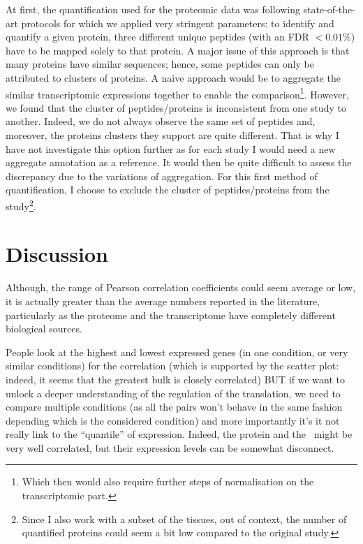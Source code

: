 At first, the quantification used for the proteomic data was following
state-of-the-art protocols for which we applied very stringent parameters:
to identify and quantify a given protein, three different unique peptides
(with an \gls{FDR} $< 0.01 \%$) have to be mapped solely to that protein.
A major issue of this approach is that many proteins have similar sequences;
hence, some peptides can only be attributed to clusters of proteins.
A naive approach would
be to aggregate the similar transcriptomic expressions together to enable
the comparison\footnote{Which then would also require further steps of
normalisation on the transcriptomic part.}. However, we found that the cluster
of peptides/proteins is inconsistent from one study to another. Indeed, we do
not always observe the same set of peptides and, moreover, the proteins clusters
they support are quite different. That is why I have not investigate this option
further as for each study I would need a new aggregate annotation as a reference.
It would then be quite difficult to assess the discrepancy due to the
variations of aggregation. For this first method of quantification, I choose to
exclude the cluster of peptides/proteins from the study\footnote{Since I also work
with a subset of the tissues, out of context, the number of quantified proteins
could seem a bit low compared to the original study.}.

\section{Discussion}

Although, the range of Pearson correlation coefficients could seem average or
low, it is actually greater than the average numbers reported in the literature,
particularly as the proteome and the transcriptome have completely different
biological sources.


People look at the highest and lowest expressed genes (in one condition, or very
similar conditions) for the correlation (which is supported by the scatter plot:
indeed, it seems that the greatest bulk is closely correlated) {\Large BUT} if we
want to unlock a deeper understanding of the regulation of the translation, we need
to compare multiple conditions (as all the pairs won't behave in the same fashion
depending which is the considered condition) and more importantly it's it not
really link to the ``quantile'' of expression. Indeed, the protein and the \mRNA\
might be very well correlated, but their expression levels can be somewhat disconnect.

